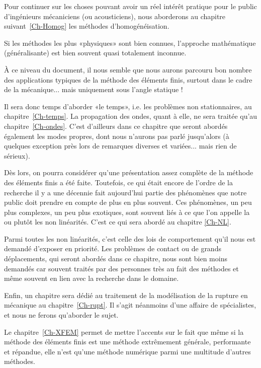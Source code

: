 \medskip
Pour continuer sur les choses pouvant avoir un réel intérêt pratique pour le public d'ingénieurs
mécaniciens (ou acousticiens), nous aborderons au chapitre suivant~\ref{Ch-Homog} les
méthodes d'homogénéisation.

Si les méthodes les plus «physiques» sont bien connues,
l'approche mathématique (généralisante) est bien souvent quasi totalement inconnue.

\medskip
À ce niveau du document, il nous semble que nous aurons parcouru bon nombre des applications
typiques de la méthode des éléments finis, surtout dans le cadre de la mécanique... mais uniquement sous l'angle
statique !

Il sera donc temps d'aborder «le temps», i.e. les problèmes non stationnaires, au
chapitre~\ref{Ch-temps}.
La propagation des ondes, quant à elle, ne sera traitée qu'au chapitre~\ref{Ch-ondes}.
C'est d'ailleurs dans ce chapitre que seront abordés également les modes propres, dont
nous n'aurons pas parlé jusqu'alors (à quelques exception près lors de remarques diverses
et variées... mais rien de sérieux).

\medskip
Dès lors, on pourra considérer qu'une présentation assez complète de la méthode des éléments finis a été faite.
Toutefois, ce qui était encore de l'ordre de la recherche il y a une décennie fait aujourd'hui
partie des phénomènes que notre public doit prendre en compte de plus en plus souvent.
Ces phénomènes, un peu plus complexes, un peu plus exotiques, sont souvent liés à
ce que l'on appelle la ou plutôt les non linéarités. C'est ce qui sera abordé au chapitre
\ref{Ch-NL}.

Parmi toutes les non linéarités, c'est celle des lois de comportement qu'il nous est demandé
d'exposer en priorité. Les problèmes de contact ou de grands déplacements, qui seront
abordés dans ce chapitre, nous sont bien moins demandés car souvent traités par des
personnes très au fait des méthodes et même souvent en lien avec la recherche dans
le domaine.

\medskip
Enfin, un chapitre sera dédié au traitement de la modélisation de la rupture en mécanique
au chapitre~\ref{Ch-rupt}.
Il s'agit néanmoins d'une affaire de spécialistes, et nous ne ferons qu'aborder le sujet.

\medskip
Le chapitre~\ref{Ch-XFEM} permet de mettre l'accents sur le fait que même si la méthode des éléments finis
est une méthode extrêmement générale, performante et répandue, elle n'est qu'une
méthode numérique parmi une multitude d'autres méthodes.

